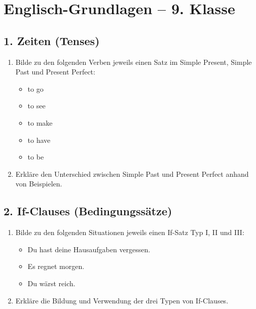 
\section*{Englisch-Grundlagen – 9. Klasse}

\subsection*{1. Zeiten (Tenses)}
\begin{enumerate}
    \item Bilde zu den folgenden Verben jeweils einen Satz im Simple Present, Simple Past und Present Perfect:
    \begin{itemize}
        \item to go
        \item to see
        \item to make
        \item to have
        \item to be
    \end{itemize}
    \item Erkläre den Unterschied zwischen Simple Past und Present Perfect anhand von Beispielen.
\end{enumerate}

\subsection*{2. If-Clauses (Bedingungssätze)}
\begin{enumerate}
    \item Bilde zu den folgenden Situationen jeweils einen If-Satz Typ I, II und III:
    \begin{itemize}
        \item Du hast deine Hausaufgaben vergessen.
        \item Es regnet morgen.
        \item Du wärst reich.
    \end{itemize}
    \item Erkläre die Bildung und Verwendung der drei Typen von If-Clauses.
\end{enumerate}

